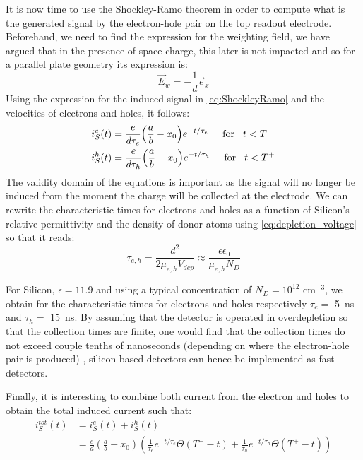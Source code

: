 		It is now time to use the Shockley-Ramo theorem in order to compute what is the generated signal by the electron-hole pair on the top readout electrode. Beforehand, we need to find the expression for the weighting field, we have argued that in the presence of space charge, this later is not impacted and so for a parallel plate geometry its expression is: 
		\begin{equation}
			\vec{E}_w = - \frac{1}{d} \vec{e}_x
		\end{equation}
		Using the expression for the induced signal in \eqref{eq:ShockleyRamo} and the velocities of electrons and holes, it follows: 
		\begin{equation}
			\begin{split}
				i_S^e(t) &= \frac{e}{d\tau_e}{\left( \frac{a}{b} - x_0 \right)} e^{-t/\tau_e} \hspace{5mm} \text{for} \hspace{3mm} t < T^- \\
				i_S^h(t) &= \frac{e}{d\tau_h}{\left( \frac{a}{b} - x_0 \right)} e^{+t/\tau_h} \hspace{5mm} \text{for} \hspace{3mm} t < T^+
			\end{split}
		\end{equation}
		The validity domain of the equations is important as the signal will no longer be induced from the moment the charge will be collected at the electrode. We can rewrite the characteristic times for electrons and holes as a function of Silicon's relative permittivity and the density of donor atoms using \eqref{eq:depletion_voltage} so that it reads: 
		\begin{equation}
			\tau_{e,h} = \frac{d^2}{2 \mu_{e,h}V_{dep}} \approx \frac{\epsilon \epsilon_0}{\mu_{e,h} N_D}
		\end{equation}

		For Silicon, $\epsilon = 11.9$ and using a typical concentration of $N_D = 10^{12}$ cm$^{-3}$, we obtain for the characteristic times for electrons and holes respectively $\tau_e =$ \SI{5}{\nano\second} and $\tau_h =$ \SI{15}{\nano\second}. By assuming that the detector is operated in overdepletion so that the collection times are finite, one would find that the collection times do not exceed couple tenths of nanoseconds (depending on where the electron-hole pair is produced) \cite{detectors}, silicon based detectors can hence be implemented as fast detectors. 

		Finally, it is interesting to combine both current from the electron and holes to obtain the total induced current such that: 
		\begin{equation}
			\begin{split}
				i_S^{tot}(t) 	&= i_S^{e}(t) + i_S^{h}(t) \\
											&=\frac{e}{d} {\left( \frac{a}{b} -x_0\right)} {\left( \frac{1}{\tau_e}e^{-t/\tau_e}\Theta(T^- - t) + \frac{1}{\tau_h}e^{+t/\tau_h}\Theta(T^+ - t) \right)}
			\end{split}
		\end{equation}

